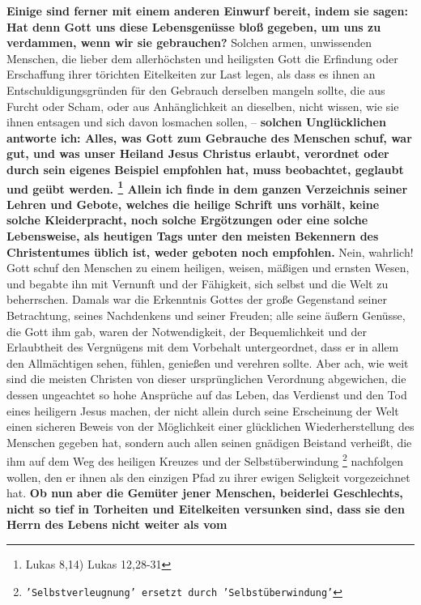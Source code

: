 {\label{ref:17_11_einwand_2} \textbf{Einige sind ferner mit einem anderen Einwurf 
bereit, indem sie sagen:
Hat denn
Gott uns diese Lebensgenüsse bloß gegeben, um uns zu verdammen, wenn wir sie
gebrauchen?} Solchen armen, unwissenden Menschen, die lieber dem allerhöchsten
und heiligsten Gott die Erfindung oder Erschaffung ihrer törichten Eitelkeiten
zur Last legen, als dass es ihnen an Entschuldigungsgründen für den Gebrauch
derselben mangeln sollte, die aus Furcht oder Scham, oder aus Anhänglichkeit an
dieselben, nicht wissen, wie sie ihnen entsagen und sich davon losmachen sollen,
-- \label{ref:17_11_beteubung}\textbf{solchen Unglücklichen antworte ich: Alles, was Gott zum Gebrauche 
des
Menschen schuf, war gut, und was unser Heiland Jesus Christus erlaubt,
verordnet oder durch sein eigenes Beispiel empfohlen hat, muss beobachtet,
geglaubt und geübt werden. 
\footnote{Lukas  8,14) Lukas 12,28-31}
Allein ich
finde in dem ganzen Verzeichnis seiner Lehren und Gebote, welches die heilige
Schrift uns vorhält, keine solche Kleiderpracht, noch solche Ergötzungen oder
eine solche Lebensweise, als heutigen Tags unter den meisten Bekennern des
Christentumes üblich ist, weder geboten noch empfohlen.} Nein, wahrlich! Gott
schuf den Menschen zu einem heiligen, weisen, mäßigen und ernsten Wesen, und
begabte ihn mit Vernunft und der Fähigkeit, sich selbst und die Welt zu beherrschen.
Damals war die Erkenntnis Gottes der große Gegenstand seiner Betrachtung, seines
Nachdenkens und seiner Freuden; alle seine äußern Genüsse, die Gott ihm gab,
waren der Notwendigkeit, der Bequemlichkeit und der Erlaubtheit des Vergnügens
mit dem Vorbehalt untergeordnet, dass er in allem den Allmächtigen sehen,
fühlen, genießen und verehren sollte. Aber ach, wie weit sind die meisten
Christen von dieser ursprünglichen Verordnung abgewichen, die dessen ungeachtet
so hohe Ansprüche auf das Leben, das Verdienst und den Tod eines heiligern Jesus
machen, der nicht allein durch seine Erscheinung der Welt einen sicheren Beweis
von der Möglichkeit einer glücklichen Wiederherstellung des Menschen gegeben
hat, sondern auch allen seinen gnädigen Beistand verheißt, die ihm auf dem Weg
des heiligen Kreuzes und der Selbstüberwindung
\footnote{\texttt{'Selbstverleugnung' ersetzt durch 'Selbstüberwindung'}}
nachfolgen wollen, den er ihnen
als den einzigen Pfad zu ihrer ewigen Seligkeit vorgezeichnet hat. \textbf{Ob
nun aber
die Gemüter jener Menschen, beiderlei Geschlechts, nicht so tief in Torheiten und
Eitelkeiten versunken sind, dass sie den Herrn des Lebens nicht weiter als vom
}}
